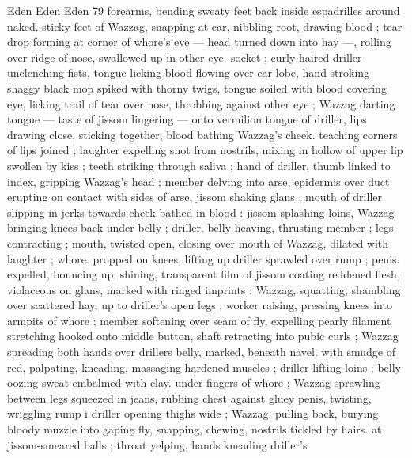 Eden Eden Eden 79
forearms, bending sweaty feet back inside espadrilles around naked.
sticky feet of Wazzag, snapping at ear, nibbling root, drawing blood
; tear-drop forming at corner of whore’s eye — head turned down
into hay —, rolling over ridge of nose, swallowed up in other eye-
socket ; curly-haired driller unclenching fists, tongue licking blood
flowing over ear-lobe, hand stroking shaggy black mop spiked with
thorny twigs, tongue soiled with blood covering eye, licking trail of
tear over nose, throbbing against other eye ; Wazzag darting tongue
— taste of jissom lingering — onto vermilion tongue of driller, lips
drawing close, sticking together, blood bathing Wazzag's cheek.
teaching corners of lips joined ; laughter expelling snot from
nostrils, mixing in hollow of upper lip swollen by kiss ; teeth striking
through saliva ; hand of driller, thumb linked to index, gripping
Wazzag's head ; member delving into arse, epidermis over duct
erupting on contact with sides of arse, jissom shaking glans ; mouth
of driller slipping in jerks towards cheek bathed in blood : jissom
splashing loins, Wazzag bringing knees back under belly ; driller.
belly heaving, thrusting member ; legs contracting ; mouth, twisted
open, closing over mouth of Wazzag, dilated with laughter ; whore.
propped on knees, lifting up driller sprawled over rump ; penis.
expelled, bouncing up, shining, transparent film of jissom coating
reddened flesh, violaceous on glans, marked with ringed imprints :
Wazzag, squatting, shambling over scattered hay, up to driller's open
legs ; worker raising, pressing knees into armpits of whore ; member
softening over seam of fly, expelling pearly filament stretching
hooked onto middle button, shaft retracting into pubic curls ; Wazzag
spreading both hands over drillers belly, marked, beneath navel.
with smudge of red, palpating, kneading, massaging hardened
muscles ; driller lifting loins ; belly oozing sweat embalmed with clay.
under fingers of whore ; Wazzag sprawling between legs squeezed
in jeans, rubbing chest against gluey penis, twisting, wriggling rump
i driller opening thighs wide ; Wazzag. pulling back, burying bloody
muzzle into gaping fly, snapping, chewing, nostrils tickled by hairs.
at jissom-smeared balls ; throat yelping, hands kneading driller's

